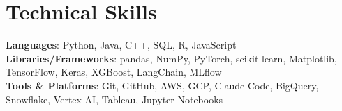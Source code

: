 \documentclass[letterpaper,11pt]{article}
\begin{document}
\section{Technical Skills}
 \begin{itemize}[leftmargin=0in, label={}]
    \small{\item{
     \textbf{Languages}{: Python, Java, C++, SQL, R, JavaScript} \\
     \textbf{Libraries/Frameworks}{: pandas, NumPy, PyTorch, scikit-learn, Matplotlib, TensorFlow, Keras, XGBoost, LangChain, MLflow} \\
     \textbf{Tools \& Platforms}{: Git, GitHub, AWS, GCP, Claude Code, BigQuery, Snowflake, Vertex AI, Tableau, Jupyter Notebooks}
    }}
 \end{itemize}
\end{document}
